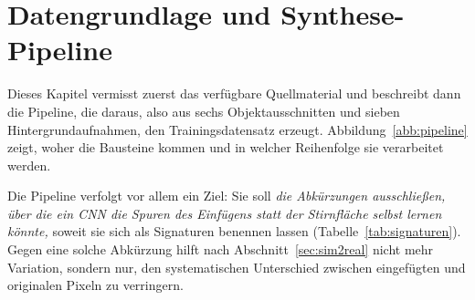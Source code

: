 %
%
%
%

\chapter{Datengrundlage und Synthese-Pipeline}
\label{kap:pipeline}

Dieses Kapitel vermisst zuerst das verfügbare Quellmaterial und beschreibt dann
die Pipeline, die daraus, also aus sechs Objektausschnitten und sieben
Hintergrundaufnahmen, den Trainingsdatensatz erzeugt.
Abbildung~\ref{abb:pipeline} zeigt, woher die Bausteine kommen und in welcher
Reihenfolge sie verarbeitet werden.

Die Pipeline verfolgt vor allem ein Ziel: Sie soll \emph{die Abkürzungen
ausschließen, über die ein CNN die Spuren des Einfügens statt der Stirnfläche
selbst lernen könnte,} soweit sie sich als Signaturen
benennen lassen (Tabelle~\ref{tab:signaturen}). Gegen eine solche Abkürzung
hilft nach Abschnitt~\ref{sec:sim2real} nicht mehr Variation, sondern nur, den
systematischen Unterschied zwischen eingefügten und originalen Pixeln zu
verringern.

